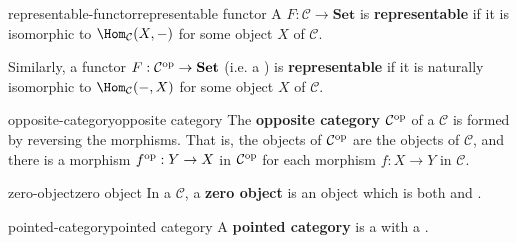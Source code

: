 \begin{topic}{representable-functor}{representable functor}
    A  $F : \mathcal{C} \to \textbf{Set}$ is \textbf{representable} if it is  isomorphic to $\Hom_\mathcal{C}(X, -)$ for some object $X$ of $\mathcal{C}$.
    
    Similarly, a functor $F : \mathcal{C}^\textup{op} \to \textbf{Set}$ (i.e. a ) is \textbf{representable} if it is naturally isomorphic to $\Hom_\mathcal{C}(-, X)$ for some object $X$ of $\mathcal{C}$.
\end{topic}

\begin{topic}{opposite-category}{opposite category}
    The \textbf{opposite category} $\mathcal{C}^\textup{op}$ of a  $\mathcal{C}$ is formed by reversing the morphisms. That is, the objects of $\mathcal{C}^\textup{op}$ are the objects of $\mathcal{C}$, and there is a morphism $f^\textup{op} : Y \to X$ in $\mathcal{C}^\textup{op}$ for each morphism $f : X \to Y$ in $\mathcal{C}$.
\end{topic}

\begin{topic}{zero-object}{zero object}
    In a  $\mathcal{C}$, a \textbf{zero object} is an object which is both  and .
\end{topic}

\begin{topic}{pointed-category}{pointed category}
    A \textbf{pointed category} is a  with a .
\end{topic}


